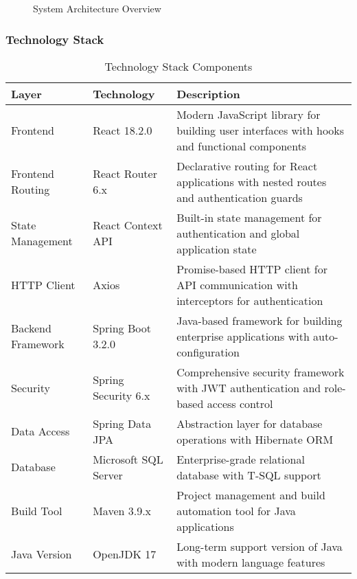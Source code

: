 \documentclass[12pt,a4paper]{article}
\begin{document}
\begin{figure}[H]
\centering
{}
\caption{System Architecture Overview}
\label{fig:system-architecture}
\end{figure}

\subsubsection{Technology Stack}

\begin{table}[H]
\centering
\caption{Technology Stack Components}
\label{tab:tech-stack}
\begin{tabularx}{\textwidth}{|l|l|X|}
\hline
\textbf{Layer} & \textbf{Technology} & \textbf{Description} \\
\hline
Frontend & React 18.2.0 & Modern JavaScript library for building user interfaces with hooks and functional components \\
\hline
Frontend Routing & React Router 6.x & Declarative routing for React applications with nested routes and authentication guards \\
\hline
State Management & React Context API & Built-in state management for authentication and global application state \\
\hline
HTTP Client & Axios & Promise-based HTTP client for API communication with interceptors for authentication \\
\hline
Backend Framework & Spring Boot 3.2.0 & Java-based framework for building enterprise applications with auto-configuration \\
\hline
Security & Spring Security 6.x & Comprehensive security framework with JWT authentication and role-based access control \\
\hline
Data Access & Spring Data JPA & Abstraction layer for database operations with Hibernate ORM \\
\hline
Database & Microsoft SQL Server & Enterprise-grade relational database with T-SQL support \\
\hline
Build Tool & Maven 3.9.x & Project management and build automation tool for Java applications \\
\hline
Java Version & OpenJDK 17 & Long-term support version of Java with modern language features \\
\hline
\end{tabularx}
\end{table}
\end{document}
